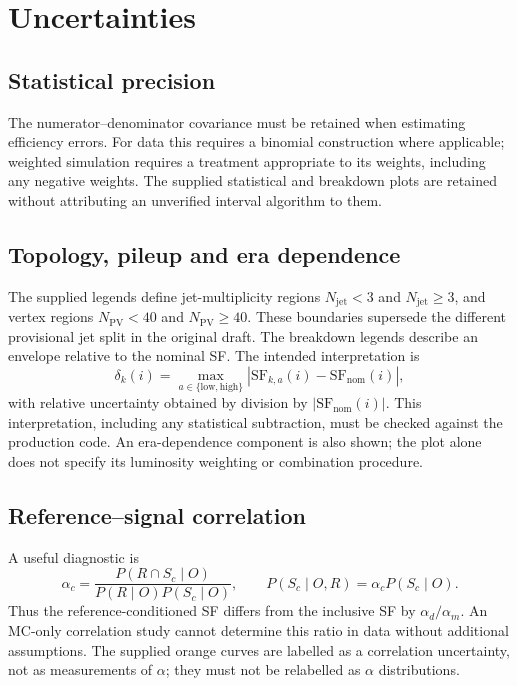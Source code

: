 \section{Uncertainties}\label{sec:unc}
\subsection{Statistical precision}
The numerator--denominator covariance must be retained when estimating efficiency errors. For data this requires a binomial construction where applicable; weighted simulation requires a treatment appropriate to its weights, including any negative weights. The supplied statistical and breakdown plots are retained without attributing an unverified interval algorithm to them.
\subsection{Topology, pileup and era dependence}
The supplied legends define jet-multiplicity regions $N_{\mathrm{jet}}<3$ and $N_{\mathrm{jet}}\geq3$, and vertex regions $N_{\mathrm{PV}}<40$ and $N_{\mathrm{PV}}\geq40$. These boundaries supersede the different provisional jet split in the original draft. The breakdown legends describe an envelope relative to the nominal SF. The intended interpretation is
\begin{equation}
\delta_k(i)=\max_{a\in\{\mathrm{low,high}\}}|\mathrm{SF}_{k,a}(i)-\mathrm{SF}_{\mathrm{nom}}(i)|,
\end{equation}
with relative uncertainty obtained by division by $|\mathrm{SF}_{\mathrm{nom}}(i)|$. This interpretation, including any statistical subtraction, must be checked against the production code. An era-dependence component is also shown; the plot alone does not specify its luminosity weighting or combination procedure.
\subsection{Reference--signal correlation}\label{sec:corr}
A useful diagnostic is
\begin{equation}
\alpha_c=\frac{P(R\cap S_c\mid O)}{P(R\mid O)P(S_c\mid O)},\qquad P(S_c\mid O,R)=\alpha_c P(S_c\mid O).
\end{equation}
Thus the reference-conditioned SF differs from the inclusive SF by $\alpha_d/\alpha_m$. An MC-only correlation study cannot determine this ratio in data without additional assumptions. The supplied orange curves are labelled as a correlation uncertainty, not as measurements of $\alpha$; they must not be relabelled as $\alpha$ distributions.
